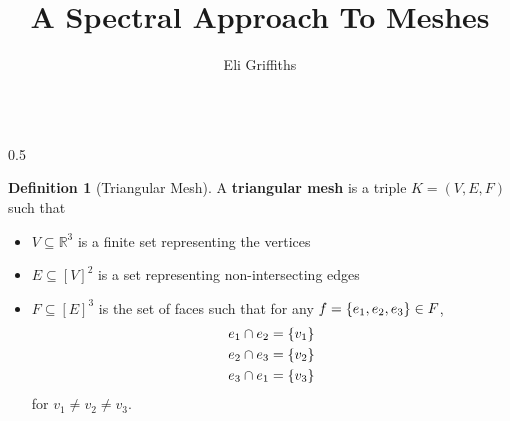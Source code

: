 \documentclass[notheorems]{beamer}
\author{Eli Griffiths}
\title{A Spectral Approach To Meshes}
\theoremstyle{definition}
\newtheorem{definition}{Definition}
\begin{document}
\begin{frame}
    \titlepage
\end{frame}

\begin{frame}
    \begin{columns}
    \begin{column}{0.5\pagewidth}
        \begin{definition}[Triangular Mesh]
            A \textbf{triangular mesh} is a triple $K = (V, E, F)$ such that
            \begin{itemize}
                \item<2-> $V \subseteq \mathbb{R}^3$ is a finite set representing the vertices
                \item<3-> $E \subseteq [V]^2$ is a set representing non-intersecting edges
                \item<4-> $F \subseteq [E]^3$ is the set of faces such that for any $f = \qty{e_1, e_2, e_3} \in F$, 
                    \begin{align*}
                        e_1 \cap e_2 &= \qty{v_1} \\
                        e_2 \cap e_3 &= \qty{v_2} \\
                        e_3 \cap e_1 &= \qty{v_3}
                    \end{align*}
                    for $v_1 \neq v_2 \neq v_3$. 
            \end{itemize}
        \end{definition}
    \end{column}


\end{columns}
\end{frame}
\end{document}

